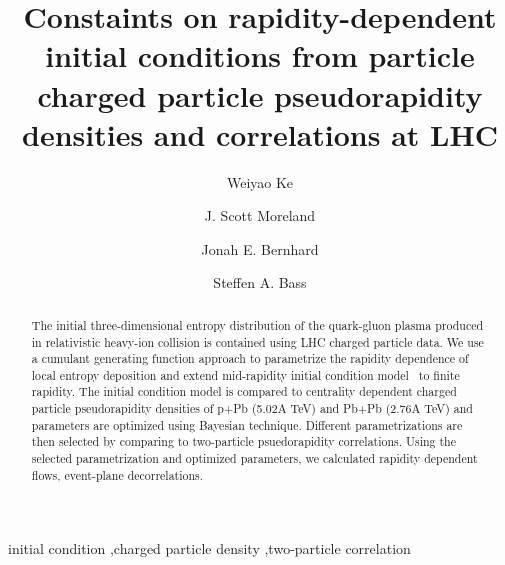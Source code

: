 \documentclass[3p,times,twocolumn]{elsarticle}
\begin{document}
\begin{frontmatter}



\dochead{}

\title{Constaints on rapidity-dependent initial conditions from particle charged particle pseudorapidity densities and correlations at LHC}


\author{Weiyao Ke}
\author{J. Scott Moreland}
\author{Jonah E. Bernhard}
\author{Steffen A. Bass}

\address{Department of Physics, Duke University, Durham, NC 27708-0305, United States}

\begin{abstract}
The initial three-dimensional entropy distribution of the quark-gluon plasma produced in relativistic heavy-ion collision is contained using LHC charged particle data.
We use a cumulant generating function approach to parametrize the rapidity dependence of local entropy deposition and extend mid-rapidity initial condition model \trento~to finite rapidity.
The initial condition model is compared to centrality dependent charged particle pseudorapidity densities
of p+Pb (5.02A TeV) and Pb+Pb (2.76A TeV) and parameters are optimized using Bayesian technique.
Different parametrizations are then selected by comparing to two-particle psuedorapidity correlations.
Using the selected parametrization and optimized parameters, we calculated rapidity dependent flows, event-plane decorrelations.

\end{abstract}

\begin{keyword}
initial condition \sep charged particle density \sep two-particle correlation


\end{keyword}

\end{frontmatter}
\end{document}
